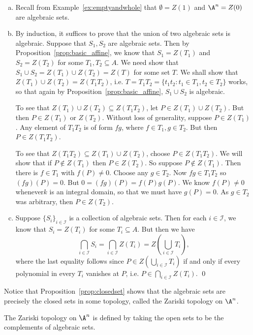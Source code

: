 \pf \hfill
\begin{enumerate}[(a)]
\item Recall from Example~\ref{ex:emptyandwhole} that $\emptyset= Z(1)$ and $\A^n= Z(0)$ are algebraic sets. 

\item By induction, it suffices to prove that the union of two algebraic sets is algebraic. Suppose that $S_1,S_2$ are algebraic sets. Then by Proposition~\ref{prop:basic_affine}, we know that $S_1= Z(T_1)$ and $S_2= Z(T_2)$ for some $T_1,T_2 \subseteq A$. We need show that $S_1 \cup S_2= Z(T_1) \cup Z(T_2)= Z(T)$ for some set $T$. We shall show that $Z(T_1) \cup Z(T_2)= Z(T_1T_2)$, i.e. $T= T_1T_2= \{ t_1t_2 \colon t_1 \in T_1, t_2 \in T_2 \}$ works, so that again by Proposition~\ref{prop:basic_affine}, $S_1 \cup S_2$ is algebraic. 

To see that $Z(T_1) \cup Z(T_2) \subseteq Z(T_1T_2)$, let $P \in Z(T_1) \cup  Z(T_2)$. But then $P \in Z(T_1)$ or $Z(T_2)$. Without loss of generality, suppose $P \in Z(T_1)$. Any element of $T_1T_2$ is of form $fg$, where $f \in T_1, g \in T_2$. But then $P \in Z(T_1T_2)$. 

To see that $Z(T_1T_2) \subseteq Z(T_1) \cup Z(T_2)$, choose $P \in Z(T_1T_2)$. We will show that if $P \notin Z(T_1)$ then $P \in Z(T_2)$. So suppose $P \notin Z(T_1)$. Then there is $f \in T_1$ with $f(P) \neq 0$. Choose any $g \in T_2$. Now $fg \in T_1T_2$ so $(fg)(P)= 0$. But $0= (fg)(P)= f(P)g(P)$. We know $f(P) \neq 0$ whenever$k$ is an integral domain, so that we must have $g(P)= 0$. As $g \in T_2$ was arbitrary, then $P \in Z(T_2)$.
 
\item Suppose $\{S_i\}_{i \in \mathcal{I}}$ is a collection of algebraic sets. Then for each $i \in \mathcal{I}$, we know that $S_i= Z(T_i)$ for some $T_i \subseteq A$. But then we have
	\[
	\bigcap_{i \in \mathcal{I}} S_i= \bigcap_{i \in \mathcal{I}} Z(T_i) = Z \left( \bigcup_{i \in \mathcal{I}} T_i \right),
	\]
where the last equality follows since $P \in Z(\bigcup_{i \in \mathcal{I}} T_i)$ if and only if every polynomial in every $T_i$ vanishes at $P$, i.e. $P \in \bigcap_{i \in \mathcal{I}} Z(T_i)$. \qed \\
\end{enumerate}


Notice that Proposition~\ref{prop:closedset} shows that the algebraic sets are precisely the closed sets in some topology, called the Zariski topology on $\A^n$.


\begin{dfn}
The Zariski topology on $\A^n$ is defined by taking the open sets to be the complements of algebraic sets. 
\end{dfn}


